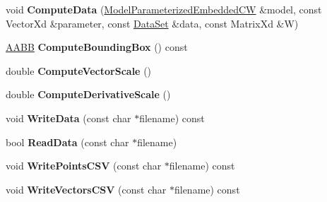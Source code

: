 \begin{DoxyCompactItemize}
\item 
\hypertarget{struct_d_r_d_s_p_1_1_reduced_data_a13cf0745aa959c739253cd0d19b77d02}{void {\bfseries Compute\-Data} (\hyperlink{struct_d_r_d_s_p_1_1_model_parameterized_embedded_c_w}{Model\-Parameterized\-Embedded\-C\-W} \&model, const Vector\-Xd \&parameter, const \hyperlink{struct_d_r_d_s_p_1_1_data_set}{Data\-Set} \&data, const Matrix\-Xd \&W)}\label{struct_d_r_d_s_p_1_1_reduced_data_a13cf0745aa959c739253cd0d19b77d02}

\item 
\hypertarget{struct_d_r_d_s_p_1_1_reduced_data_ae8d15e5d1a61ed5e495112e4941b9ecb}{\hyperlink{struct_d_r_d_s_p_1_1_a_a_b_b}{A\-A\-B\-B} {\bfseries Compute\-Bounding\-Box} () const }\label{struct_d_r_d_s_p_1_1_reduced_data_ae8d15e5d1a61ed5e495112e4941b9ecb}

\item 
\hypertarget{struct_d_r_d_s_p_1_1_reduced_data_a603dadcceb2b793a76851ec687adad12}{double {\bfseries Compute\-Vector\-Scale} ()}\label{struct_d_r_d_s_p_1_1_reduced_data_a603dadcceb2b793a76851ec687adad12}

\item 
\hypertarget{struct_d_r_d_s_p_1_1_reduced_data_a6b5e802882a81572f3db17e5d1b0afa2}{double {\bfseries Compute\-Derivative\-Scale} ()}\label{struct_d_r_d_s_p_1_1_reduced_data_a6b5e802882a81572f3db17e5d1b0afa2}

\item 
\hypertarget{struct_d_r_d_s_p_1_1_reduced_data_a2eaa9d6f19f0c80998fb06c3f2ef4035}{void {\bfseries Write\-Data} (const char $\ast$filename) const }\label{struct_d_r_d_s_p_1_1_reduced_data_a2eaa9d6f19f0c80998fb06c3f2ef4035}

\item 
\hypertarget{struct_d_r_d_s_p_1_1_reduced_data_a0eedb12f1ca3d0775d10472f491fc72b}{bool {\bfseries Read\-Data} (const char $\ast$filename)}\label{struct_d_r_d_s_p_1_1_reduced_data_a0eedb12f1ca3d0775d10472f491fc72b}

\item 
\hypertarget{struct_d_r_d_s_p_1_1_reduced_data_a79e492ae200fb5da34340f410e158354}{void {\bfseries Write\-Points\-C\-S\-V} (const char $\ast$filename) const }\label{struct_d_r_d_s_p_1_1_reduced_data_a79e492ae200fb5da34340f410e158354}

\item 
\hypertarget{struct_d_r_d_s_p_1_1_reduced_data_a972703812e0d0194e5287966a74df79f}{void {\bfseries Write\-Vectors\-C\-S\-V} (const char $\ast$filename) const }\label{struct_d_r_d_s_p_1_1_reduced_data_a972703812e0d0194e5287966a74df79f}

\end{DoxyCompactItemize}
